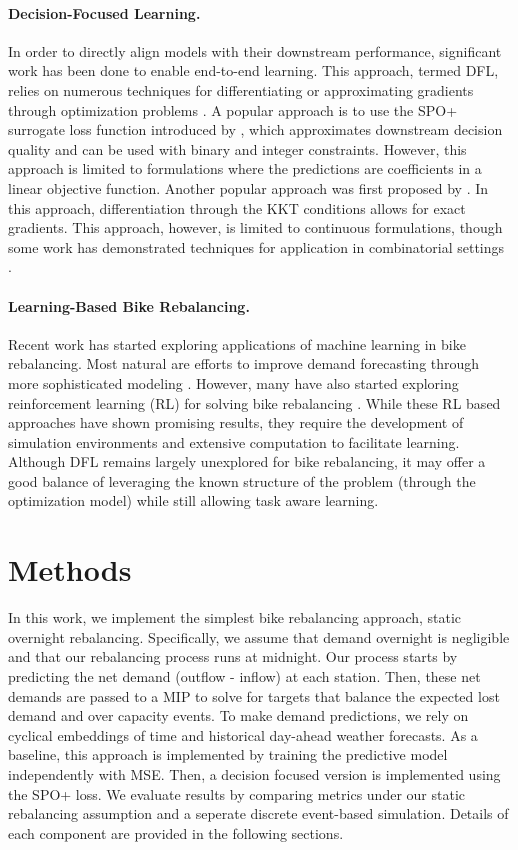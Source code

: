 \documentclass{article}
\begin{document}
\paragraph{Decision-Focused Learning.}
In order to directly align models with their downstream performance, significant work has been done to enable end-to-end learning. This approach, termed DFL, relies on numerous techniques for differentiating or approximating gradients through optimization problems \cite{mandi2024DFL}.
A popular approach is to use the SPO+ surrogate loss function introduced by \citet{elmachtoub2022spo}, which approximates downstream decision quality and can be used with binary and integer constraints. However, this approach is limited to formulations where the predictions are 
coefficients in a linear objective function. Another popular approach was first proposed by \citet{amos2017optnet}. In this approach, differentiation through the KKT conditions allows for exact gradients. This approach, however, is limited to continuous formulations, though some work 
has demonstrated techniques for application in combinatorial settings \cite{wilder2019melding}.  

\paragraph{Learning-Based Bike Rebalancing.}
Recent work has started exploring applications of machine learning in bike rebalancing. Most natural are efforts to improve demand forecasting through more sophisticated modeling \cite{hulot2018forecasting}. However, many have also started exploring reinforcement learning (RL) for solving 
bike rebalancing \cite{liang2025rl}. While these RL based approaches have shown promising results, they require the development of simulation environments and extensive computation to facilitate learning. Although DFL remains largely unexplored for bike rebalancing, it may offer a good balance of 
leveraging the known structure of the problem (through the optimization model) while still allowing task aware learning.

\section{Methods}
In this work, we implement the simplest bike rebalancing approach, static overnight rebalancing. Specifically, we assume that demand overnight is negligible and that our rebalancing process runs at midnight. Our process starts by predicting the net demand (outflow - inflow) at each station. Then, these net demands are passed to 
a MIP to solve for targets that balance the expected lost demand and over capacity events. To make demand predictions, we rely on cyclical embeddings of time and historical day-ahead weather forecasts. As a baseline, this approach is implemented by training the predictive model independently with MSE. Then, a decision focused version is implemented using the SPO+ loss. We evaluate results by comparing metrics under our static rebalancing assumption and a seperate discrete event-based simulation. 
Details of each component are provided in the following sections.
\end{document}
